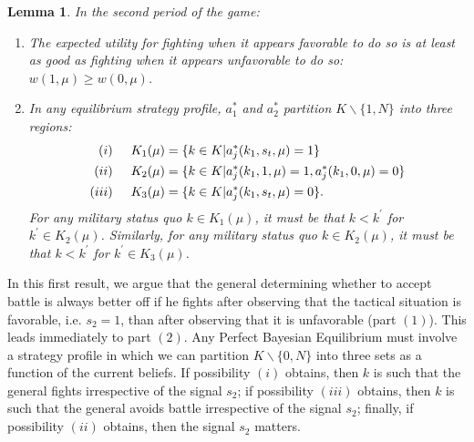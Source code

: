 \documentclass[11pt,]{article}
\newtheorem{lemma}[]{Lemma}
\begin{document}
\begin{lemma}In the second period of the game:
\begin{enumerate}
\item The expected utility for fighting when it appears favorable to do so is at least as good as fighting when it appears unfavorable to do so: $w(1,\mu)\geq w(0,\mu)$.  %
\item In any equilibrium strategy profile, $a_1^*$ and $a_2^*$ partition $K\backslash\{1,N\}$ into three regions:
\begin{align*}
(i)\hspace{5mm}K_1(\mu)&=\{k\in K|a_j^*(k_1,s_t,\mu)=1\}\\
(ii)\hspace{5mm}K_2(\mu)&=\{k\in K|a^*_j(k_1,1,\mu)=1,a^*_j(k_1,0,\mu)=0\}\\
(iii)\hspace{5mm}K_3(\mu)&=\{k\in K|a^*_j(k_1,s_t,\mu)=0\}.
\end{align*}For any military status quo $k\in K_1(\mu)$, it must be that $k<k^{\prime}$ for $k^{\prime}\in K_2(\mu)$.  Similarly, for any military status quo $k\in K_2(\mu)$, it must be that $k<k^{\prime}$ for $k^{\prime}\in K_3(\mu)$.  
\end{enumerate}\label{second period expected utility}
\end{lemma}  \noindent In this first result, we argue that the general determining whether to accept battle is always better off if he fights after observing that the tactical situation is favorable, i.e. $s_2=1$, than after observing that it is unfavorable (part $(1)$).  This leads immediately to part $(2)$.  Any Perfect Bayesian Equilibrium must involve a strategy profile in which we can partition $K\backslash\{0,N\}$ into three sets as a function of the current beliefs.  If possibility $(i)$ obtains, then $k$ is such that the general fights irrespective of the signal $s_2$; if possibility $(iii)$ obtains, then $k$ is such that the general avoids battle irrespective of the signal $s_2$; finally, if possibility $(ii)$ obtains, then the signal $s_2$ matters.  
\end{document}
